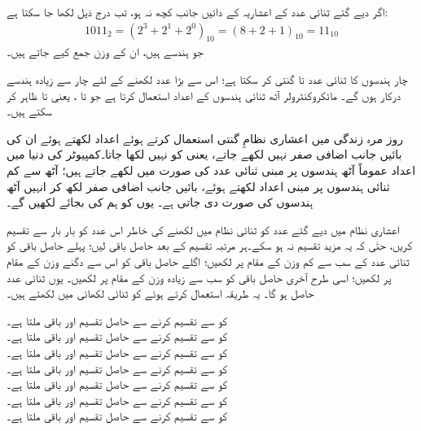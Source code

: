 اگر دیے گئے ثنائی  عدد  کے  اعشاریہ کے دائیں جانب کچھ نہ ہو،  تب  درج ذیل لکھا جا سکتا  ہے:
\begin{align}
1011_2=(2^3+2^1+2^0)_{10}=(8+2+1)_{10}=11_{10}
\end{align}
 جو  ہندسے     ہیں، ان کے وزن جمع کیے  جاتے ہیں۔

چار ہندسوں کا  ثنائی عدد  تا    گنتی کر سکتا ہے؛   اس سے بڑا عدد   لکھنے  کے لئے  چار سے زیادہ ہندسے درکار ہوں گے۔ مائکروکنٹرولر آٹھ ثنائی ہندسوں کے اعداد استعمال کرتا ہے جو    تا ، یعنی  تا      ظاہر کر سکتے ہیں۔

روز مرہ  زندگی میں اعشاری نظامِ گنتی استعمال کرتے ہوئے اعداد لکھتے  ہوئے  ان کی  بائیں جانب اضافی  صفر نہیں لکھے جاتے،  یعنی  کو  نہیں لکھا جاتا۔کمپیوٹر کی دنیا میں اعداد عموماً آٹھ ہندسوں پر مبنی ثنائی عدد کی صورت میں لکھے جاتے ہیں؛ آٹھ سے کم ثنائی ہندسوں پر مبنی اعداد لکھتے  ہوئے،  بائیں جانب  اضافی صفر  لکھ کر انہیں    آٹھ ہندسوں کی صورت دی جاتی ہے۔ یوں  کو ہم    کی بجائے   لکھیں گے۔

اعشاری نظام میں دیے  گئے عدد کو ثنائی نظام میں لکھنے کی خاطر اس  عدد کو بار بار    سے تقسیم کریں،  حتٰی کہ یہ مزید تقسیم نہ ہو سکے۔ہر مرتبہ تقسیم کے بعد حاصل باقی لیں؛ پہلے حاصل باقی کو ثنائی عدد کے سب سے کم وزن  کے  مقام پر لکھیں؛ اگلے حاصل باقی کو اس سے دگنے وزن کے مقام پر لکھیں؛ اسی طرح آخری حاصل باقی کو  سب سے زیادہ وزن کے مقام پر لکھیں۔ یوں ثنائی عدد حاصل ہو گا۔	یہ طریقہ استعمال کرتے ہوئے   کو ثنائی لکھائی میں لکھتے ہیں۔

 کو  سے تقسیم کرنے سے حاصل تقسیم  اور  باقی    ملتا ہے۔\\
 کو  سے تقسیم کرنے سے حاصل تقسیم  اور  باقی    ملتا ہے۔\\
 کو  سے تقسیم کرنے سے حاصل تقسیم  اور  باقی    ملتا ہے۔\\
 کو  سے تقسیم کرنے سے حاصل تقسیم  اور  باقی    ملتا ہے۔\\
 کو  سے تقسیم کرنے سے حاصل تقسیم  اور  باقی    ملتا ہے۔\\
 کو  سے تقسیم کرنے سے حاصل تقسیم  اور  باقی    ملتا ہے۔\\
 کو  سے تقسیم کرنے سے حاصل تقسیم  اور  باقی    ملتا ہے۔


